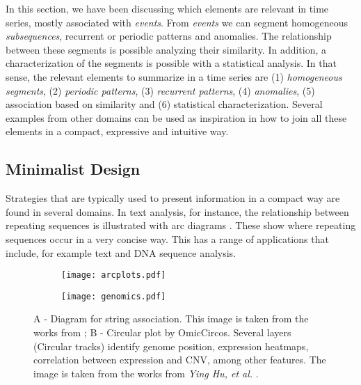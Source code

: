 In this section, we have been discussing which elements are relevant in time series, mostly associated with \textit{events}. From \textit{events} we can segment homogeneous \textit{subsequences}, recurrent or periodic patterns and anomalies. The relationship between these segments is possible analyzing their similarity. In addition, a characterization of the segments is possible with a statistical analysis. In that sense, the relevant elements to summarize in a time series are (1) \textit{homogeneous segments}, (2) \textit{periodic patterns}, (3) \textit{recurrent patterns}, (4) \textit{anomalies}, (5) association based on similarity and (6) statistical characterization. Several examples from other domains can be used as inspiration in how to join all these elements in a compact, expressive and intuitive way.

\subsection{Minimalist Design}

Strategies that are typically used to present information in a compact way are found in several domains. In text analysis, for instance, the relationship between repeating sequences is illustrated with arc diagrams \cite{bitmap, arcplots}. These show where repeating sequences occur in a very concise way. This has a range of applications that include, for example text and DNA sequence analysis.

\begin{figure}[b]
    \centering
    \begin{subfigure}{0.5\linewidth}
    \centering
        \texttt{[image: arcplots.pdf]}
        \caption{}
        \label{fig:genomic}
    \end{subfigure}%
    \begin{subfigure}{0.5\linewidth}
        \centering
        \texttt{[image: genomics.pdf]}
        \caption{}
        \label{fig:genomic}
    \end{subfigure}
    \caption{A - Diagram for string association. This image is taken from the works from \cite{arcplots}; B - Circular plot by OmicCircos. Several layers (Circular tracks) identify genome position, expression heatmaps, correlation between expression and CNV, among other features. The image is taken from the works from \textit{Ying Hu, et al.} \cite{genomics}.}
\end{figure}

